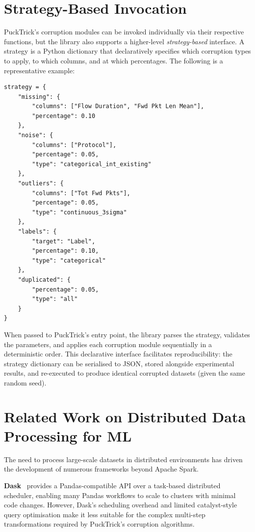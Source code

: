 \section{Strategy-Based Invocation}
\label{sec:pucktrick-strategy}

PuckTrick's corruption modules can be invoked individually via their
respective functions, but the library also supports a higher-level
\emph{strategy-based} interface.  A strategy is a Python dictionary that
declaratively specifies which corruption types to apply, to which columns, and
at which percentages.  The following is a representative example:

\begin{verbatim}
strategy = {
    "missing": {
        "columns": ["Flow Duration", "Fwd Pkt Len Mean"],
        "percentage": 0.10
    },
    "noise": {
        "columns": ["Protocol"],
        "percentage": 0.05,
        "type": "categorical_int_existing"
    },
    "outliers": {
        "columns": ["Tot Fwd Pkts"],
        "percentage": 0.05,
        "type": "continuous_3sigma"
    },
    "labels": {
        "target": "Label",
        "percentage": 0.10,
        "type": "categorical"
    },
    "duplicated": {
        "percentage": 0.05,
        "type": "all"
    }
}
\end{verbatim}

When passed to PuckTrick's entry point, the library parses the strategy,
validates the parameters, and applies each corruption module sequentially in a
deterministic order.  This declarative interface facilitates reproducibility: the
strategy dictionary can be serialised to JSON, stored alongside experimental
results, and re-executed to produce identical corrupted datasets (given the same
random seed).


\section{Related Work on Distributed Data Processing for ML}
\label{sec:distributed-ml}

The need to process large-scale datasets in distributed environments has driven
the development of numerous frameworks beyond Apache Spark.

\textbf{Dask}~\cite{rocklin2015dask} provides a Pandas-compatible API over a
task-based distributed scheduler, enabling many Pandas workflows to scale to
clusters with minimal code changes.  However, Dask's scheduling overhead and
limited catalyst-style query optimisation make it less suitable for the
complex multi-step transformations required by PuckTrick's corruption
algorithms.

